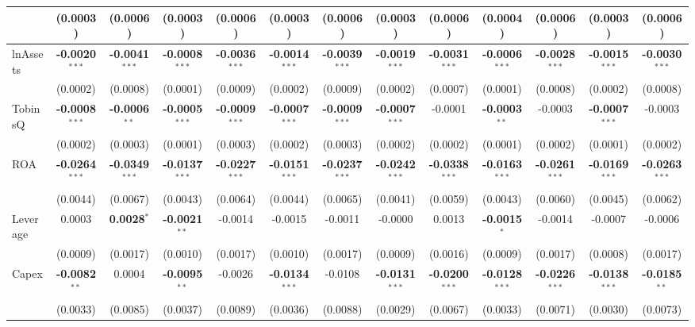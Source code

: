 \documentclass[11pt,a4paper]{article}
\begin{document}
\begin{table}[htbp]
\begin{tabular}{lcccccccccccc}
 & (0.0003) & (0.0006) & (0.0003) & (0.0006) & (0.0003) & (0.0006) & (0.0003) & (0.0006) & (0.0004) & (0.0006) & (0.0003) & (0.0006) \\
\midrule
lnAssets & \textbf{-0.0020}$^{***}$ & \textbf{-0.0041}$^{***}$ & \textbf{-0.0008}$^{***}$ & \textbf{-0.0036}$^{***}$ & \textbf{-0.0014}$^{***}$ & \textbf{-0.0039}$^{***}$ & \textbf{-0.0019}$^{***}$ & \textbf{-0.0031}$^{***}$ & \textbf{-0.0006}$^{***}$ & \textbf{-0.0028}$^{***}$ & \textbf{-0.0015}$^{***}$ & \textbf{-0.0030}$^{***}$ \\
 & (0.0002) & (0.0008) & (0.0001) & (0.0009) & (0.0002) & (0.0009) & (0.0002) & (0.0007) & (0.0001) & (0.0008) & (0.0002) & (0.0008) \\
TobinsQ & \textbf{-0.0008}$^{***}$ & \textbf{-0.0006}$^{**}$ & \textbf{-0.0005}$^{***}$ & \textbf{-0.0009}$^{***}$ & \textbf{-0.0007}$^{***}$ & \textbf{-0.0009}$^{***}$ & \textbf{-0.0007}$^{***}$ & -0.0001 & \textbf{-0.0003}$^{**}$ & -0.0003 & \textbf{-0.0007}$^{***}$ & -0.0003 \\
 & (0.0002) & (0.0003) & (0.0001) & (0.0003) & (0.0002) & (0.0003) & (0.0002) & (0.0002) & (0.0001) & (0.0002) & (0.0001) & (0.0002) \\
ROA & \textbf{-0.0264}$^{***}$ & \textbf{-0.0349}$^{***}$ & \textbf{-0.0137}$^{***}$ & \textbf{-0.0227}$^{***}$ & \textbf{-0.0151}$^{***}$ & \textbf{-0.0237}$^{***}$ & \textbf{-0.0242}$^{***}$ & \textbf{-0.0338}$^{***}$ & \textbf{-0.0163}$^{***}$ & \textbf{-0.0261}$^{***}$ & \textbf{-0.0169}$^{***}$ & \textbf{-0.0263}$^{***}$ \\
 & (0.0044) & (0.0067) & (0.0043) & (0.0064) & (0.0044) & (0.0065) & (0.0041) & (0.0059) & (0.0043) & (0.0060) & (0.0045) & (0.0062) \\
Leverage & 0.0003 & \textbf{0.0028}$^{*}$ & \textbf{-0.0021}$^{**}$ & -0.0014 & -0.0015 & -0.0011 & -0.0000 & 0.0013 & \textbf{-0.0015}$^{*}$ & -0.0014 & -0.0007 & -0.0006 \\
 & (0.0009) & (0.0017) & (0.0010) & (0.0017) & (0.0010) & (0.0017) & (0.0009) & (0.0016) & (0.0009) & (0.0017) & (0.0008) & (0.0017) \\
Capex & \textbf{-0.0082}$^{**}$ & 0.0004 & \textbf{-0.0095}$^{**}$ & -0.0026 & \textbf{-0.0134}$^{***}$ & -0.0108 & \textbf{-0.0131}$^{***}$ & \textbf{-0.0200}$^{***}$ & \textbf{-0.0128}$^{***}$ & \textbf{-0.0226}$^{***}$ & \textbf{-0.0138}$^{***}$ & \textbf{-0.0185}$^{**}$ \\
 & (0.0033) & (0.0085) & (0.0037) & (0.0089) & (0.0036) & (0.0088) & (0.0029) & (0.0067) & (0.0033) & (0.0071) & (0.0030) & (0.0073) \\

\end{tabular}
\end{table}
\end{document}
